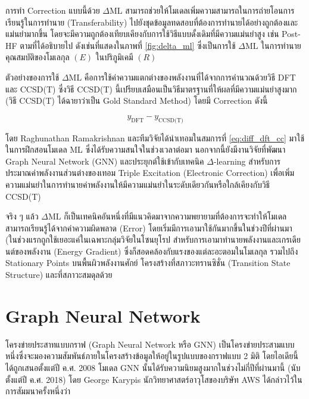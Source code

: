การทำ Correction แบบนี้ด้วย $\Delta\text{ML}$ สามารถช่วยให้โมเดลเพิ่มความสามารถในการถ่ายโอนการเรียนรู้ในการทำนาย (Transferability) ไปยังชุดข้อมูลทดสอบที่ต้องการทำนายได้อย่างถูกต้องและแม่นยำมากขึ้น โดยจะมีความถูกต้องเทียบเคียงกับการใช้วิธีแบบดั้งเดิมที่มีความแม่นยำสูง เช่น Post-HF ตามที่ได้อธิบายไป ดังเช่นที่แสดงในภาพที่ \ref{fig:delta_ml} ซึ่งเป็นการใช้ $\Delta\text{ML}$ ในการทำนายคุณสมบัติของโมเลกุล $(E)$ ในปริภูมิเคมี $(R)$

ตัวอย่างของการใช้ $\Delta\text{ML}$ คือการใช้ค่าความแตกต่างของพลังงานที่ได้จากการคำนวณด้วยวิธี DFT และ CCSD(T) ซึ่งวิธี CCSD(T) นี้เปรียบเสมือนเป็นวิธีมาตรฐานที่ให้ผลที่มีความแม่นยำสูงมาก (วิธี CCSD(T) ได้ฉายาว่าเป็น Gold Standard Method) โดยมี Correction ดังนี้

\begin{equation}\label{eq:diff_dft_cc}
    y_{\text{DFT}} - y_{\text{CCSD(T)}}
\end{equation}

โดย Raghunathan Ramakrishnan และทีมวิจัยได้นำเทอมในสมการที่ \eqref{eq:diff_dft_cc} มาใช้ในการฝึกสอนโมเดล ML ซึ่งได้รับความสนใจในช่วงเวลาต่อมา\autocite{ramakrishnan2015a} นอกจากนี้ยังมีงานวิจัยที่พัฒนา Graph Neural Network (GNN) และประยุกต์ใช้เข้ากับเทคนิค $\Delta$-learning สำหรับการประมาณค่าพลังงานส่วนต่างของเทอม Triple Excitation (Electronic Correction) เพื่อเพิ่มความแม่นยำในการทำนายค่าพลังงานให้มีความแม่นยำในระดับเดียวกันหรือใกล้เคียงกับวิธี CCSD(T)\autocite{ruth2022}

จริง ๆ แล้ว $\Delta\text{ML}$ ก็เป็นเทคนิคอันหนึ่งที่มีแนวคิดมาจากความพยายามที่ต้องการจะทำให้โมเดลสามารถเรียนรู้ได้จากค่าความผิดพลาด (Error) โดยเริ่มมีการเอามาใช้กันมากขึ้นในช่วงปีที่ผ่านมา (ในช่วงแรกถูกใช้เยอะแค่ในเฉพาะกลุ่มวิจัยในโซนยุโรป สำหรับการเอามาทำนายพลังงานและเกรเดียนต์ของพลังงาน (Energy Gradient) ซึ่งก็สอดคล้องกับแรงของแต่ละอะตอมในโมเลกุล รวมไปถึง Stationary Points บนพื้นผิวพลังงานศักย์ โครงสร้างที่สภาวะทรานซิชั่น (Transition State Structure) และที่สภาวะสมดุลด้วย

\section{Graph Neural Network}
\label{sec:gnn}

โครงข่ายประสาทแบบกราฟ (Graph Neural Network หรือ GNN) เป็นโครงข่ายประสามแบบหนึ่งซึ่งจะมองความสัมพันธ์ภายในโครงสร้างข้อมูลให้อยู่ในรูปแบบของกราฟแบบ 2 มิติ โดยไอเดียนี้ได้ถูกเสนอตั้งแต่ปี ค.ศ. 2008\autocite{scarselli2009,zhou2020} โมเดล GNN นั้นได้รับความนิยมสูงมากในช่วงไม่กี่ปีที่ผ่านมานี้ (นับตั้งแต่ปี ค.ศ. 2018) โดย George Karypis นักวิทยาศาสตร์อาวุโสของบริษัท AWS ได้กล่าวไว้ในการสัมมนาครั้งหนึ่งว่า

